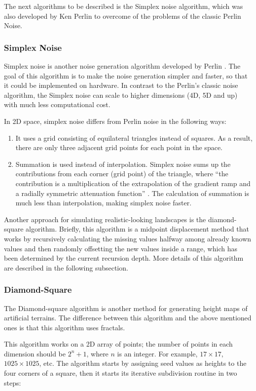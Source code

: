 The next algorithms to be described is the Simplex noise algorithm, which was also developed by Ken Perlin \cite{perlin:2001} to overcome of the problems of the classic Perlin Noise.

\subsubsection{Simplex Noise}
Simplex noise is another noise generation algorithm developed by Perlin \cite{perlin:2001}. The goal of this algorithm is to make the noise generation simpler and faster, so that it could be implemented on hardware. In contrast to the Perlin's classic noise algorithm, the Simplex noise can scale to higher dimensions (4D, 5D and up) with much less computational cost. 

In 2D space, simplex noise differs from Perlin noise in the following ways:
\begin{enumerate}
	\item It uses a grid consisting of equilateral triangles instead of squares. As a result, there are only three adjacent grid points for each point in the space.
	\item Summation is used instead of interpolation. Simplex noise sums up the contributions from each corner (grid point) of the triangle, where ``the contribution is a multiplication of the extrapolation of the gradient ramp and a radially symmetric attenuation function'' \cite{Gustavson2005}. The calculation of summation is much less than interpolation, making simplex noise faster.
\end{enumerate}

Another approach for simulating realistic-looking landscapes is the diamond-square algorithm. Briefly, this algorithm is a midpoint displacement method that works by recursively calculating the missing values halfway among already known values and then randomly offsetting the new values inside a range, which has been determined by the current recursion depth. More details of this algorithm are described in the following subsection.

\subsubsection{Diamond-Square}
The Diamond-square algorithm is another method for generating height maps of artificial terrains. The difference between this algorithm and the above mentioned ones is that this algorithm uses fractals. 

This algorithm works on a 2D array of points; the number of points in each dimension should be $2^{n} + 1$, where $n$ is an integer. For example, $17 \times 17$, $1025 \times 1025$, etc. The algorithm starts by assigning seed values as heights to the four corners of a square, then it starts its iterative subdivision routine in two steps:

